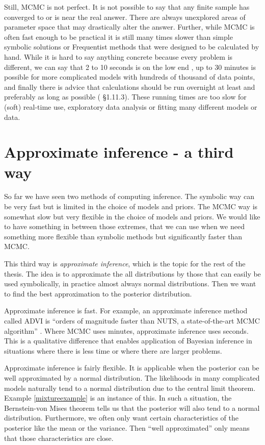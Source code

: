 \documentclass[12pt,vu]{adammath}
\theoremstyle{plain}
\theoremstyle{definition}
\theoremstyle{remark}
\begin{document}
Still, MCMC is not perfect.
It is not possible to say that any finite sample has converged to or is near the real answer.
There are always unexplored areas of parameter space that may drastically alter the answer.
Further, while MCMC is often fast enough to be practical it is still many times slower than simple symbolic solutions or Frequentist methods that were designed to be calculated by hand.
While it is hard to say anything concrete because every problem is different, we can say that 2 to 10 seconds is on the low end \cite{stanisfast}, up to 30 minutes is possible for more complicated models with hundreds of thousand of data points, and finally there is advice that calculations should be run overnight at least and preferably as long as possible (\cite{mcmchandbook} \S 1.11.3).
These running times are too slow for (soft) real-time use, exploratory data analysis or fitting many different models or data.

\section{Approximate inference - a third way}\label{thirdway}
So far we have seen two methods of computing inference.
The symbolic way can be very fast but is limited in the choice of models and priors.
The MCMC way is somewhat slow but very flexible in the choice of models and priors.
We would like to have something in between those extremes, that we can use when we need something more flexible than symbolic methods but significantly faster than MCMC.

This third way is \emph{approximate inference}, which is the topic for the rest of the thesis.
The idea is to approximate the all distributions by those that can easily be used symbolically, in practice almost always normal distributions.
Then we want to find the best approximation to the posterior distribution.

Approximate inference is fast.
For example, an approximate inference method called ADVI is ``orders of magnitude faster than NUTS, a state-of-the-art MCMC algorithm'' \cite{advi}.
Where MCMC uses minutes, approximate inference uses seconds.
This is a qualitative difference that enables application of Bayesian inference in situations where there is less time or where there are larger problems.

Approximate inference is fairly flexible.
It is applicable when the posterior can be well approximated by a normal distribution.
The likelihoods in many complicated models naturally tend to a normal distribution due to the central limit theorem.
Example \ref{mixtureexample} is an instance of this.
In such a situation, the Bernstein-von Mises theorem tells us that the posterior will also tend to a normal distribution.
Furthermore, we often only want certain characteristics of the posterior like the mean or the variance.
Then ``well approximated'' only means that those characteristics are close.
\end{document}
